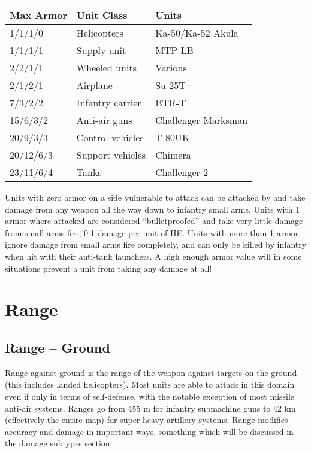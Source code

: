 \documentclass{article}
\begin{document}
\begin{center}
    \begin{tabular}{ | l | l | l | }
    \hline
    Max Armor & Unit Class & Units \\ \hline
    1/1/1/0 & Helicopters & Ka-50/Ka-52 Akula \\
    1/1/1/1 & Supply unit & MTP-LB \\
    2/2/1/1 & Wheeled units & Various \\
    2/1/2/1 & Airplane & Su-25T \\
    7/3/2/2 & Infantry carrier & BTR-T \\
    15/6/3/2 & Anti-air guns & Challenger Marksman \\
    20/9/3/3 & Control vehicles & T-80UK \\
    20/12/6/3 & Support vehicles & Chimera \\
    23/11/6/4 & Tanks & Challenger 2 \\ \hline
    \end{tabular}
\end{center}

Units with zero armor on a side vulnerable to attack can be attacked by and
take damage from any weapon all the way down to infantry small arms. Units with
1 armor where attacked are considered ``bulletproofed'' and take very little
damage from small arms fire, 0.1 damage per unit of HE. Units with more than 1
armor ignore damage from small arms fire completely, and can only be killed by
infantry when hit with their anti-tank launchers. A high enough armor value will
in some situations prevent a unit from taking any damage at all!

\section{Range}

\subsection{Range -- Ground}

Range against ground is the range of the weapon against targets on the ground
(this includes landed helicopters). Most units are able to attack in this
domain even if only in terms of self-defense, with the notable exception of most
missile anti-air systems. Ranges go from 455 m for infantry submachine guns to
42 km (effectively the entire map) for super-heavy artillery systems. Range
modifies accuracy and damage in important ways, something which will be
discussed in the damage subtypes section.
\end{document}
